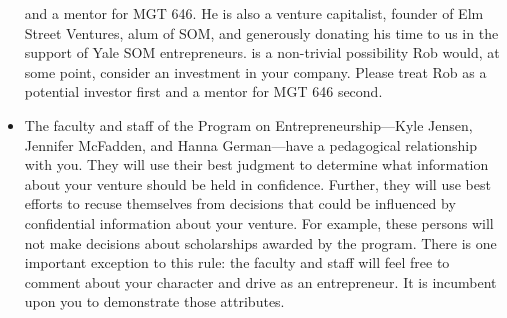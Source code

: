 \begin{itemize}
		and a mentor for MGT 646.
		He is also a venture capitalist, founder of Elm Street Ventures,
		alum of SOM, and generously donating his time to us in the support
		of Yale SOM entrepreneurs.
		is a non-trivial possibility Rob would, at some point, consider an
		investment in your company. Please treat Rob as a potential
		investor first and a mentor for MGT 646 second.  
	\item The faculty and staff of the Program on Entrepreneurship---Kyle Jensen,
		Jennifer McFadden, and Hanna
		German---have a pedagogical relationship with you. They will 
		use their best judgment to determine what information about
		your venture should be held in confidence. Further, they will
		use best efforts to recuse themselves from decisions that could
		be influenced by confidential information about your venture.
		For example, these persons will not make decisions about scholarships
		awarded by the program. There is one important exception to this
		rule: the faculty and staff will feel free to comment about your
		character and drive as an entrepreneur. It is incumbent upon you
		to demonstrate those attributes.
\end{itemize}



  